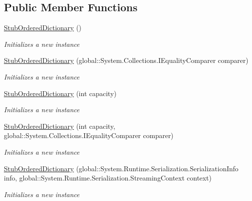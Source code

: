 \subsection*{Public Member Functions}
\begin{DoxyCompactItemize}
\item 
\hyperlink{class_system_1_1_collections_1_1_specialized_1_1_fakes_1_1_stub_ordered_dictionary_a91d42d608a61e93e7e0240c3787cedb1}{Stub\-Ordered\-Dictionary} ()
\begin{DoxyCompactList}\small\item\em Initializes a new instance\end{DoxyCompactList}\item 
\hyperlink{class_system_1_1_collections_1_1_specialized_1_1_fakes_1_1_stub_ordered_dictionary_a3ff965b87668c5d6b96cc9631090368c}{Stub\-Ordered\-Dictionary} (global\-::\-System.\-Collections.\-I\-Equality\-Comparer comparer)
\begin{DoxyCompactList}\small\item\em Initializes a new instance\end{DoxyCompactList}\item 
\hyperlink{class_system_1_1_collections_1_1_specialized_1_1_fakes_1_1_stub_ordered_dictionary_a5fe96bd45330d36b6c27ed3f96a9ccf9}{Stub\-Ordered\-Dictionary} (int capacity)
\begin{DoxyCompactList}\small\item\em Initializes a new instance\end{DoxyCompactList}\item 
\hyperlink{class_system_1_1_collections_1_1_specialized_1_1_fakes_1_1_stub_ordered_dictionary_a8080328601c72255fa5eeabc192b9510}{Stub\-Ordered\-Dictionary} (int capacity, global\-::\-System.\-Collections.\-I\-Equality\-Comparer comparer)
\begin{DoxyCompactList}\small\item\em Initializes a new instance\end{DoxyCompactList}\item 
\hyperlink{class_system_1_1_collections_1_1_specialized_1_1_fakes_1_1_stub_ordered_dictionary_ade5c87988326c98f0cf2cf5b735bb374}{Stub\-Ordered\-Dictionary} (global\-::\-System.\-Runtime.\-Serialization.\-Serialization\-Info info, global\-::\-System.\-Runtime.\-Serialization.\-Streaming\-Context context)
\begin{DoxyCompactList}\small\item\em Initializes a new instance\end{DoxyCompactList}\item 

\end{DoxyCompactItemize}
